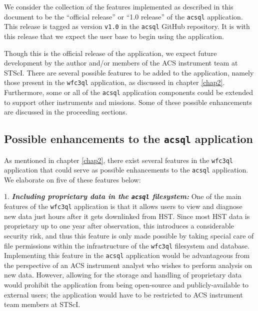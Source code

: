 \documentclass[10pt,journal,compsoc]{IEEEtran}
\begin{document}
We consider the collection of the features implemented as described in this document to be the ``official release'' or ``1.0 release'' of the \texttt{acsql} application.  This release is tagged as
version \texttt{v1.0} in the \texttt{acsql} GitHub repository.  It is with this release that we expect the user base to begin using the application.

Though this is the official release of the application, we expect future development by the author and/or members of the ACS instrument team at STScI.  There are several possible
features to be added to the application, namely those present in the \texttt{wfc3ql} application, as discussed in chapter \ref{chap2}.  Furthermore, some or all of the \texttt{acsql} application
components could be extended to support other instruments and missions.  Some of these possible enhancements are discussed in the proceeding sections.


\subsection{Possible enhancements to the \texttt{acsql} application} \label{sec5.1}

As mentioned in chapter \ref{chap2}, there exist several features in the \texttt{wfc3ql} application that could serve as possible enhancements to the \texttt{acsql} application.  We elaborate on five of
these features below:

1. \textbf{\textit{Including proprietary data in the \texttt{acsql} filesystem:}}  One of the main features of the \texttt{wfc3ql} application is that it allows users to view and diagnose new data
just hours after it gets downlinked from HST.  Since most HST data is proprietary up to one year after observation, this introduces a considerable security risk, and thus this feature is only made
possible by taking special care of file permissions within the infrastructure of the \texttt{wfc3ql} filesystem and database.  Implementing this feature in the \texttt{acsql} application would be
advantageous from the perspective of an ACS instrument analyst who wishes to perform analysis on new data.  However, allowing for the storage and handling of proprietary data would prohibit the
application from being open-source and publicly-available to external users; the application would have to be restricted to ACS instrument team members at STScI.
\end{document}
